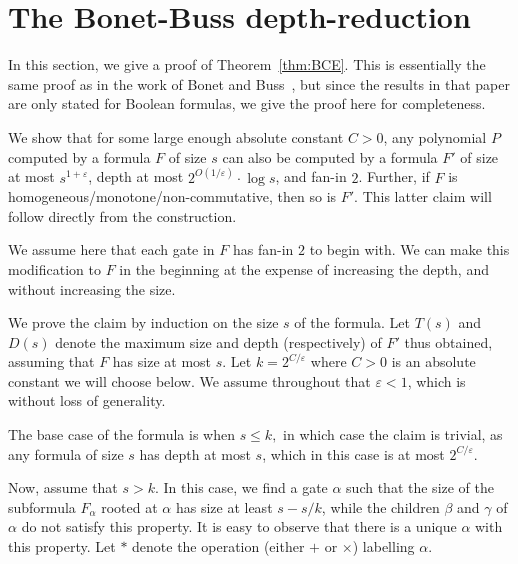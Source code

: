 \documentclass[10pt,a4paper]{article}
\begin{document}
\section{The Bonet-Buss depth-reduction}\label{sec:BonetBuss}

In this section, we give a proof of Theorem~\ref{thm:BCE}. This is essentially the same proof as in the work of Bonet and Buss~\cite{BonetBuss}, but since the results in that paper are only stated for Boolean formulas, we give the proof here for completeness.

We show that for some large enough absolute constant $C > 0$, any polynomial $P$ computed by a formula $F$ of size $s$ can also be computed by a formula $F'$ of size at most $s^{1+\varepsilon}$, depth at most $2^{O(1/\varepsilon)}\cdot \log s$, and fan-in $2$. Further, if $F$ is homogeneous/monotone/non-commutative, then so is $F'$. This latter claim will follow directly from the construction.

We assume here that each gate in $F$ has fan-in $2$ to begin with. We can make this modification to $F$ in the beginning at the expense of increasing the depth, and without increasing the size.

We prove the claim by induction on the size $s$ of the formula. Let $T(s)$ and $D(s)$ denote the maximum size and depth (respectively) of $F'$ thus obtained, assuming that $F$ has size at most $s.$ Let $k = 2^{C/\varepsilon}$ where $C > 0$ is an absolute constant we will choose below. We assume throughout that $\varepsilon < 1$, which is without loss of generality.

The base case of the formula is when $s \leq k,$ in which case the claim is trivial, as any formula of size $s$ has depth at most $s$, which in this case is at most $2^{C/\varepsilon}.$

Now, assume that $s > k.$ In this case, we find a gate $\alpha$ 
such that the size of the subformula $F_\alpha$ rooted at $\alpha$ has size at least $s-s/k$, while the children $\beta$ and $\gamma$ of $\alpha$ do not satisfy this property. It is easy to observe that there is a unique $\alpha$ with this property. 
Let $*$ denote the operation (either $+$ or $\times$) labelling $\alpha.$
\end{document}
